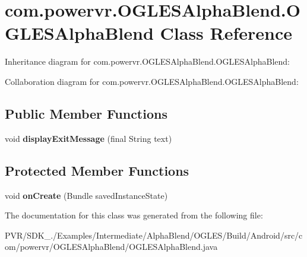\hypertarget{classcom_1_1powervr_1_1_o_g_l_e_s_alpha_blend_1_1_o_g_l_e_s_alpha_blend}{\section{com.\+powervr.\+O\+G\+L\+E\+S\+Alpha\+Blend.\+O\+G\+L\+E\+S\+Alpha\+Blend Class Reference}
\label{classcom_1_1powervr_1_1_o_g_l_e_s_alpha_blend_1_1_o_g_l_e_s_alpha_blend}
}


Inheritance diagram for com.\+powervr.\+O\+G\+L\+E\+S\+Alpha\+Blend.\+O\+G\+L\+E\+S\+Alpha\+Blend\+:


Collaboration diagram for com.\+powervr.\+O\+G\+L\+E\+S\+Alpha\+Blend.\+O\+G\+L\+E\+S\+Alpha\+Blend\+:
\subsection*{Public Member Functions}
\begin{DoxyCompactItemize}
\item 
\hypertarget{classcom_1_1powervr_1_1_o_g_l_e_s_alpha_blend_1_1_o_g_l_e_s_alpha_blend_abcc580ed8f091085c73071d4a67fc6b5}{void {\bfseries display\+Exit\+Message} (final String text)}\label{classcom_1_1powervr_1_1_o_g_l_e_s_alpha_blend_1_1_o_g_l_e_s_alpha_blend_abcc580ed8f091085c73071d4a67fc6b5}

\end{DoxyCompactItemize}
\subsection*{Protected Member Functions}
\begin{DoxyCompactItemize}
\item 
\hypertarget{classcom_1_1powervr_1_1_o_g_l_e_s_alpha_blend_1_1_o_g_l_e_s_alpha_blend_a444cb51abffa37a7dad24b03cb6f5eec}{void {\bfseries on\+Create} (Bundle saved\+Instance\+State)}\label{classcom_1_1powervr_1_1_o_g_l_e_s_alpha_blend_1_1_o_g_l_e_s_alpha_blend_a444cb51abffa37a7dad24b03cb6f5eec}

\end{DoxyCompactItemize}


The documentation for this class was generated from the following file\+:\begin{DoxyCompactItemize}
\item 
P\+V\+R/\+S\+D\+K\+\_./\+Examples/\+Intermediate/\+Alpha\+Blend/\+O\+G\+L\+E\+S/\+Build/\+Android/src/com/powervr/\+O\+G\+L\+E\+S\+Alpha\+Blend/O\+G\+L\+E\+S\+Alpha\+Blend.\+java\end{DoxyCompactItemize}
